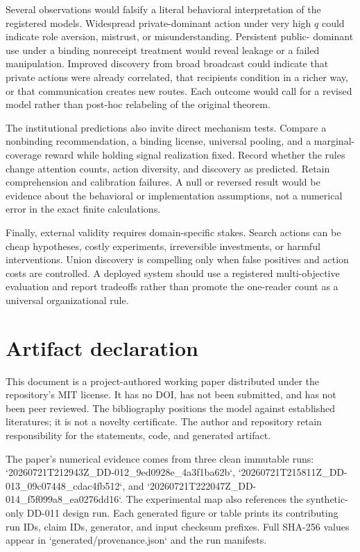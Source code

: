 \documentclass[11pt]{article}
\begin{document}
Several observations would falsify a literal behavioral interpretation of the
registered models. Widespread private-dominant action under very high $q$ could
indicate role aversion, mistrust, or misunderstanding. Persistent public-
dominant use under a binding nonreceipt treatment would reveal leakage or a
failed manipulation. Improved discovery from broad broadcast could indicate
that private actions were already correlated, that recipients condition in a
richer way, or that communication creates new routes. Each outcome would call
for a revised model rather than post-hoc relabeling of the original theorem.

The institutional predictions also invite direct mechanism tests. Compare a
nonbinding recommendation, a binding license, universal pooling, and a marginal-
coverage reward while holding signal realization fixed. Record whether the
rules change attention counts, action diversity, and discovery as predicted.
Retain comprehension and calibration failures. A null or reversed result would
be evidence about the behavioral or implementation assumptions, not a numerical
error in the exact finite calculations.

Finally, external validity requires domain-specific stakes. Search actions can
be cheap hypotheses, costly experiments, irreversible investments, or harmful
interventions. Union discovery is compelling only when false positives and
action costs are controlled. A deployed system should use a registered
multi-objective evaluation and report tradeoffs rather than promote the
one-reader count as a universal organizational rule.




\section*{Artifact declaration}

This document is a project-authored working paper distributed under the
repository's MIT license. It has no DOI, has not been submitted, and has not
been peer reviewed. The bibliography positions the model against established
literatures; it is not a novelty certificate. The author and repository retain
responsibility for the statements, code, and generated artifact.

The paper's numerical evidence comes from three clean immutable runs:
`20260721T212943Z\_DD-012\_9ed0928e\_4a3f1ba62b`,
`20260721T215811Z\_DD-013\_09c07448\_cdac4fb512`, and
`20260721T222047Z\_DD-014\_f5f099a8\_ea0276dd16`. The experimental map also
references the synthetic-only DD-011 design run. Each generated figure or table
prints its contributing run IDs, claim IDs, generator, and input checksum
prefixes. Full SHA-256 values appear in `generated/provenance.json` and the run
manifests.
\end{document}
